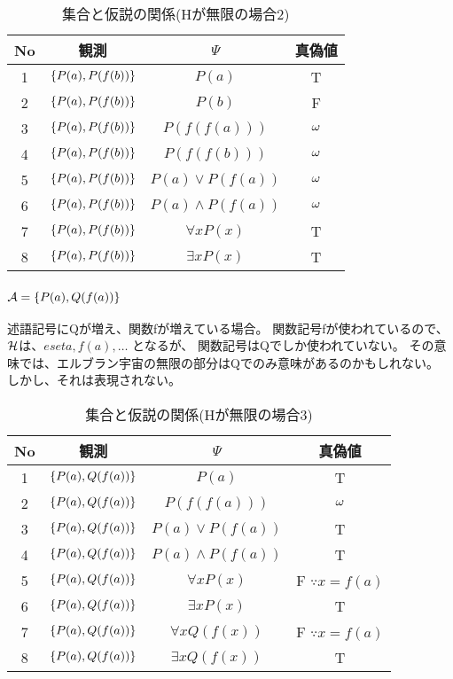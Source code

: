 \documentclass[10pt, oneside]{jarticle}   	%
\begin{document}
\begin{table}[htbp]
 \centering
 \begin{tabular}{|c|c|c|c|}\hline
   No & 観測 & $\Psi$ & 真偽値 \\ \hline
   1 & $\{{P(a), P(f(b))}\}$ & $P(a)$ & T \\ \hline
   2 & $\{{P(a), P(f(b))}\}$ & $P(b)$ & F \\ \hline
   3 & $\{{P(a), P(f(b))}\}$ & $P(f(f(a)))$ & $\omega $\\ \hline
   4 & $\{{P(a), P(f(b))}\}$ & $P(f(f(b)))$ & $\omega $\\ \hline
   5 & $\{{P(a), P(f(b))}\}$ & $P(a) \lor P(f(a))$ & $\omega$ \\ \hline
   6 & $\{{P(a), P(f(b))}\}$ & $P(a) \land P(f(a))$ &  $\omega$ \\ \hline
   7 & $\{{P(a), P(f(b))}\}$ & $\forall x P(x)$ & T \\ \hline
   8 & $\{{P(a), P(f(b))}\}$ & $\exists x P(x)$ & T \\ \hline
 \end{tabular}
 \caption{集合と仮説の関係(Hが無限の場合2)}
 \label{tab:ex0202}
\end{table}

\subsubsection{$\mathcal{A}=\{{P(a), Q(f(a))}\}$}

述語記号にQが増え、関数fが増えている場合。
関数記号fが使われているので、$\mathcal{H}$は、$eset{a, f(a), \dots}$ となるが、
関数記号はQでしか使われていない。
その意味では、エルブラン宇宙の無限の部分はQでのみ意味があるのかもしれない。
しかし、それは表現されない。

\begin{table}[htbp]
 \centering
 \begin{tabular}{|c|c|c|c|}\hline
   No & 観測 & $\Psi$ & 真偽値 \\ \hline
   1 & $\{{P(a), Q(f(a))}\}$ & $P(a)$ & T \\ \hline
   2 & $\{{P(a), Q(f(a))}\}$ & $P(f(f(a)))$ & $\omega$ \\ \hline
   3 & $\{{P(a), Q(f(a))}\}$ & $P(a) \lor P(f(a))$ & T \\ \hline
   4 & $\{{P(a), Q(f(a))}\}$ & $P(a) \land P(f(a))$ & T\\ \hline
   5 & $\{{P(a), Q(f(a))}\}$ & $\forall x P(x)$ & F $\because x=f(a)$ \\ \hline
   6 & $\{{P(a), Q(f(a))}\}$ & $\exists x P(x)$ & T \\ \hline
   7 & $\{{P(a), Q(f(a))}\}$ & $\forall x Q(f(x))$ & F $\because x=f(a)$\\ \hline
   8 & $\{{P(a), Q(f(a))}\}$ & $\exists x Q(f(x))$ & T \\ \hline
 \end{tabular}
 \caption{集合と仮説の関係(Hが無限の場合3)}
 \label{tab:ex0203}
\end{table}
\end{document}
